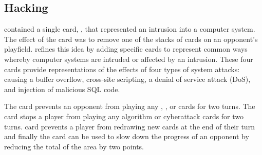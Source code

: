 \begin{comment}
\end{comment}

\subsection{Hacking}
\label{section:hacking}
\pwOne contained a single card, \Hackns, that represented an intrusion into a computer system. The effect of the \Hack card was to remove one of the stacks of cards on an opponent's playfield. \pwThree refines this idea by adding specific cards to represent common ways whereby computer systems are intruded or affected by an intrusion. These four cards provide representations of the effects of four types of system attacks: causing a buffer overflow, cross-site scripting, a denial of service attack (DoS), and injection of malicious SQL code.

The \Buf card prevents an opponent from playing any \Ins, \Rns, \V or \M cards for two turns. The \CSS card stops a player from playing any algorithm or cyberattack cards for two turns. \DoS card prevents a player from redrawing new cards at the end of their turn and finally the \SQL card can be used to slow down the progress of an opponent by reducing the total of the \MS area by two points.

